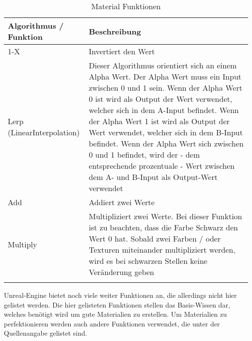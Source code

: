 \begin{longtable}{|p{4cm}|p{9.6cm}|}
    \hline
    \endfirsthead
    \textbf{Algorithmus / Funktion} & \textbf{Beschreibung}\\
    \hline
    \endhead

    1-X & Invertiert den Wert \\
    \hline

    Lerp (LinearInterpolation) & Dieser Algorithmus orientiert sich an einem Alpha Wert. Der Alpha Wert muss ein
    Input zwischen 0 und 1 sein. Wenn der Alpha Wert 0 ist wird als Output der Wert
    verwendet, welcher sich in dem A-Input befindet. Wenn der Alpha Wert 1 ist wird
    als Output der Wert verwendet, welcher sich in dem B-Input befindet. Wenn der
    Alpha Wert sich zwischen 0 und 1 befindet, wird der - dem entsprechende prozentuale -
    Wert zwischen dem A- und B-Input als Output-Wert verwendet \\
    \hline

    Add & Addiert zwei Werte \\
    \hline

    Multiply & Multipliziert zwei Werte. Bei dieser Funktion ist zu beachten, dass die Farbe Schwarz
    den Wert 0 hat. Sobald zwei Farben / oder Texturen miteinander multipliziert
    werden, wird es bei schwarzen Stellen keine Veränderung geben \\
    \hline

    \caption{Material Funktionen}
    \label{table:mat_algorithms}
\end{longtable}

Unreal-Engine bietet noch viele weiter Funktionen an, die allerdings nicht hier gelistet werden. Die hier gelisteten
Funktionen stellen das Basis-Wissen dar, welches benötigt wird um gute Materialien zu erstellen.
Um Materialien zu perfektionieren werden auch andere Funktionen verwendet, die unter der Quellenangabe gelistet
sind\citep{ue:mat_algorithms}.
